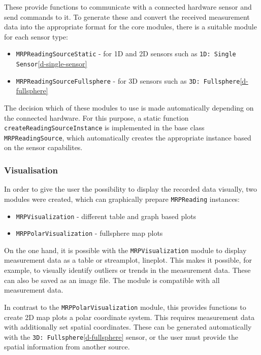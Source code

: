 These provide functions to communicate with a connected hardware sensor
and send commands to it. To generate these and convert the received
measurement data into the appropriate format for the core modules, there
is a suitable module for each sensor type:

\begin{itemize}
\tightlist
\item
  \passthrough{\lstinline!MRPReadingSourceStatic!} - for 1D and 2D
  sensors such as
  \passthrough{\lstinline!1D: Single Sensor!}\ref{d-single-sensor}
\item
  \passthrough{\lstinline!MRPReadingSourceFullsphere!} - for 3D sensors
  such as \passthrough{\lstinline!3D: Fullsphere!}\ref{d-fullsphere}
\end{itemize}

The decision which of these modules to use is made automatically
depending on the connected hardware. For this purpose, a static function
\passthrough{\lstinline!createReadingSourceInstance!} is implemented in
the base class \passthrough{\lstinline!MRPReadingSource!}, which
automatically creates the appropriate instance based on the sensor
capabilites.

\hypertarget{visualisation}{%
\subsubsection{Visualisation}\label{visualisation}}

In order to give the user the possibility to display the recorded data
visually, two modules were created, which can graphically prepare
\passthrough{\lstinline!MRPReading!} instances:

\begin{itemize}
\tightlist
\item
  \passthrough{\lstinline!MRPVisualization!} - different table and graph
  based plots
\item
  \passthrough{\lstinline!MRPPolarVisualization!} - fullsphere map plots
\end{itemize}

On the one hand, it is possible with the
\passthrough{\lstinline!MRPVisualization!} module to display measurement
data as a table or streamplot, lineplot. This makes it possible, for
example, to visually identify outliers or trends in the measurement
data. These can also be saved as an image file. The module is compatible
with all measurement data.

In contrast to the \passthrough{\lstinline!MRPPolarVisualization!}
module, this provides functions to create 2D map plots a polar
coordinate system. This requires measurement data with additionally set
spatial coordinates. These can be generated automatically with the
\passthrough{\lstinline!3D: Fullsphere!}\ref{d-fullsphere} sensor, or
the user must provide the spatial information from another source.

